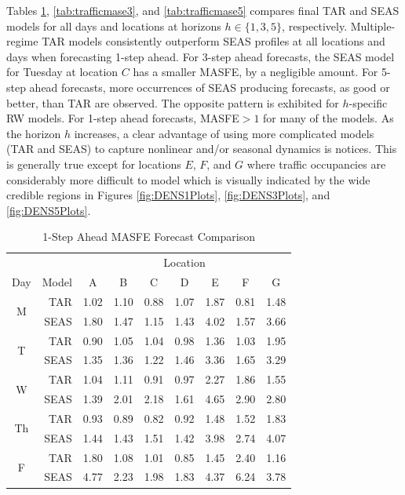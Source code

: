 Tables \ref{tab:trafficmase1}, \ref{tab:trafficmase3}, and \ref{tab:trafficmase5} compares final TAR and SEAS models for all days and locations at horizons $h\in \{1,3,5\}$, respectively. Multiple-regime TAR models consistently outperform SEAS profiles at all locations and days when forecasting 1-step ahead. For 3-step ahead forecasts, the SEAS model for Tuesday at location $C$ has a smaller MASFE, by a negligible amount. For 5-step ahead forecasts, more occurrences of SEAS producing forecasts, as good or better, than TAR are observed. The opposite pattern is exhibited for $h$-specific RW models. For 1-step ahead forecasts, MASFE$>1$ for many of the models. As the horizon $h$  increases, a clear advantage of using more complicated models (TAR and SEAS) to capture nonlinear and/or seasonal dynamics is notices. This is generally true except for locations $E$, $F$, and $G$ where traffic occupancies are considerably more difficult to model which is visually indicated by the wide credible regions in Figures \ref{fig:DENS1Plots}, \ref{fig:DENS3Plots}, and \ref{fig:DENS5Plots}.



\begin{table}[htbp]
\scriptsize
\centering
\caption{1-Step Ahead MASFE Forecast Comparison}
\begin{tabular}{c|rccccccc}
  \hline
  & & \multicolumn{7}{c}{Location}\\
  \cline{5-7}
Day & Model & A & B & C & D & E & F & G \\ 
  \hline
  \multirow{2}{*}{M} & TAR & 1.02 & 1.10 & 0.88 & 1.07 & 1.87 & 0.81 & 1.48 \\ 
  & SEAS & 1.80 & 1.47 & 1.15 & 1.43 & 4.02 & 1.57 & 3.66 \\ 
  \hline
  \multirow{2}{*}{T}  & TAR & 0.90 & 1.05 & 1.04 & 0.98 & 1.36 & 1.03 & 1.95 \\ 
  & SEAS & 1.35 & 1.36 & 1.22 & 1.46 & 3.36 & 1.65 & 3.29 \\ 
  \hline
   \multirow{2}{*}{W} & TAR & 1.04 & 1.11 & 0.91 & 0.97 & 2.27 & 1.86 & 1.55 \\ 
   & SEAS & 1.39 & 2.01 & 2.18 & 1.61 & 4.65 & 2.90 & 2.80 \\ 
  \hline
 \multirow{2}{*}{Th} & TAR & 0.93 & 0.89 & 0.82 & 0.92 & 1.48 & 1.52 & 1.83 \\ 
   & SEAS & 1.44 & 1.43 & 1.51 & 1.42 & 3.98 & 2.74 & 4.07 \\ 
  \hline
  \multirow{2}{*}{F} & TAR & 1.80 & 1.08 & 1.01 & 0.85 & 1.45 & 2.40 & 1.16 \\ 
   & SEAS & 4.77 & 2.23 & 1.98 & 1.83 & 4.37 & 6.24 & 3.78 \\ 
   \hline
\end{tabular}
\label{tab:trafficmase1}
\end{table}




